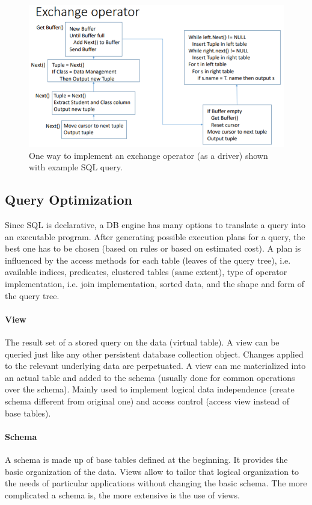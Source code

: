 \begin{figure}[h]
	\centering
	\includegraphics[scale=0.7]{images/3-exchange.PNG}
	\caption{One way to implement an exchange operator (as a driver) shown with example SQL query.}
	\label{fig:exchange}
\end{figure}


\subsection{Query Optimization}

Since SQL is declarative, a DB engine has many options to translate a query into an executable program. After generating possible execution plans for a query, the best one has to be chosen (based on rules or based on estimated cost). A plan is influenced by the access methods for each table (leaves of the query tree), i.e. available indices, predicates, clustered tables (same extent), type of operator implementation, i.e. join implementation, sorted data, and the shape and form of the query tree.

\paragraph{View}
The result set of a stored query on the data (virtual table). A view can be queried just like any other persistent database collection object. Changes applied to the relevant underlying data are perpetuated. A view can me materialized into an actual table and added to the schema (usually done for common operations over the schema). Mainly used to implement logical data independence (create schema different from original one) and access control (access view instead of base tables). %

\paragraph{Schema}
A schema is made up of base tables defined at the beginning. It provides the basic organization of the data. Views allow to tailor that logical organization to the needs of particular applications without changing the basic schema. The more complicated a schema is, the more extensive is the use of views. 

